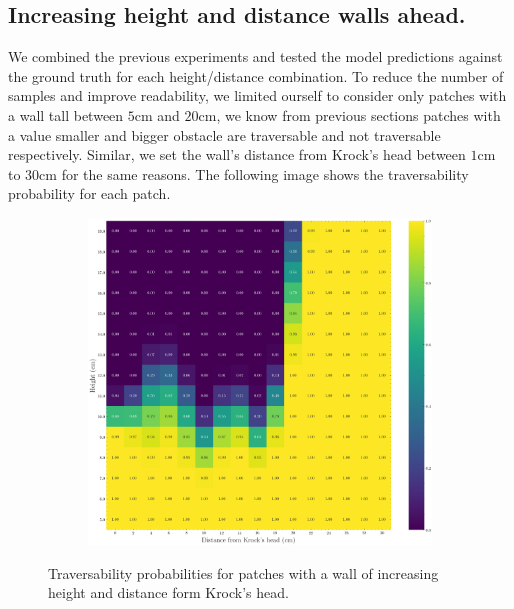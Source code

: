 \subsection{Increasing height and distance walls ahead.}
We combined the previous experiments and tested the model predictions against the ground truth for each height/distance combination. To reduce the number of samples and improve readability, we limited ourself to consider only patches with a wall tall between $5$cm and $20$cm, we know from previous sections patches with a value smaller and bigger obstacle are traversable and not traversable respectively. Similar, we set the wall's distance from Krock's head between $1$cm to $30$cm for the same reasons. The following image shows the traversability probability for each patch.
\begin{figure}[H]
    \centering
\begin{subfigure}[b]{1\textwidth}
    \includegraphics[width=\linewidth]{../img/5/custom_patches/walls_heights/walls_heights.png}
    \end{subfigure}
    \caption{Traversability probabilities for patches with a wall of increasing height and distance form Krock's head.}
\end{figure}



